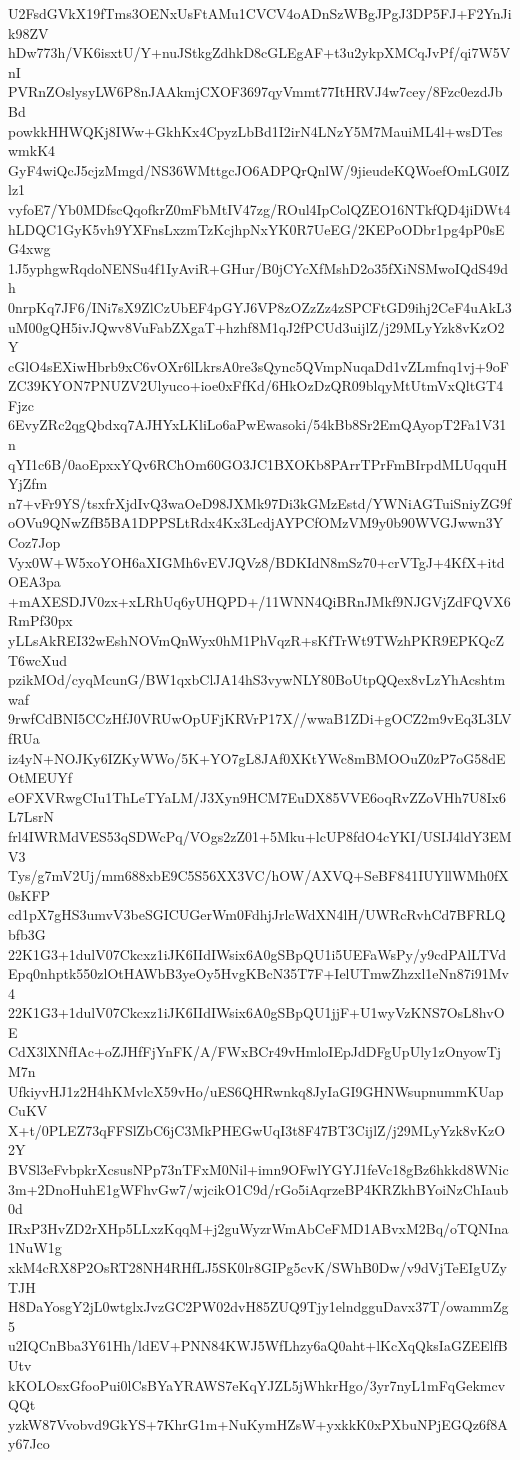 U2FsdGVkX19fTms3OENxUsFtAMu1CVCV4oADnSzWBgJPgJ3DP5FJ+F2YnJik98ZV
hDw773h/VK6isxtU/Y+nuJStkgZdhkD8cGLEgAF+t3u2ykpXMCqJvPf/qi7W5VnI
PVRnZOslysyLW6P8nJAAkmjCXOF3697qyVmmt77ItHRVJ4w7cey/8Fzc0ezdJbBd
powkkHHWQKj8IWw+GkhKx4CpyzLbBd1I2irN4LNzY5M7MauiML4l+wsDTeswmkK4
GyF4wiQcJ5cjzMmgd/NS36WMttgcJO6ADPQrQnlW/9jieudeKQWoefOmLG0IZlz1
vyfoE7/Yb0MDfscQqofkrZ0mFbMtIV47zg/ROul4IpColQZEO16NTkfQD4jiDWt4
hLDQC1GyK5vh9YXFnsLxzmTzKcjhpNxYK0R7UeEG/2KEPoODbr1pg4pP0sEG4xwg
1J5yphgwRqdoNENSu4f1IyAviR+GHur/B0jCYcXfMshD2o35fXiNSMwoIQdS49dh
0nrpKq7JF6/INi7sX9ZlCzUbEF4pGYJ6VP8zOZzZz4zSPCFtGD9ihj2CeF4uAkL3
uM00gQH5ivJQwv8VuFabZXgaT+hzhf8M1qJ2fPCUd3uijlZ/j29MLyYzk8vKzO2Y
cGlO4sEXiwHbrb9xC6vOXr6lLkrsA0re3sQync5QVmpNuqaDd1vZLmfnq1vj+9oF
ZC39KYON7PNUZV2Ulyuco+ioe0xFfKd/6HkOzDzQR09blqyMtUtmVxQltGT4Fjzc
6EvyZRc2qgQbdxq7AJHYxLKliLo6aPwEwasoki/54kBb8Sr2EmQAyopT2Fa1V31n
qYI1c6B/0aoEpxxYQv6RChOm60GO3JC1BXOKb8PArrTPrFmBIrpdMLUqquHYjZfm
n7+vFr9YS/tsxfrXjdIvQ3waOeD98JXMk97Di3kGMzEstd/YWNiAGTuiSniyZG9f
oOVu9QNwZfB5BA1DPPSLtRdx4Kx3LcdjAYPCfOMzVM9y0b90WVGJwwn3YCoz7Jop
Vyx0W+W5xoYOH6aXIGMh6vEVJQVz8/BDKIdN8mSz70+crVTgJ+4KfX+itdOEA3pa
+mAXESDJV0zx+xLRhUq6yUHQPD+/11WNN4QiBRnJMkf9NJGVjZdFQVX6RmPf30px
yLLsAkREI32wEshNOVmQnWyx0hM1PhVqzR+sKfTrWt9TWzhPKR9EPKQcZT6wcXud
pzikMOd/cyqMcunG/BW1qxbClJA14hS3vywNLY80BoUtpQQex8vLzYhAcshtmwaf
9rwfCdBNI5CCzHfJ0VRUwOpUFjKRVrP17X//wwaB1ZDi+gOCZ2m9vEq3L3LVfRUa
iz4yN+NOJKy6IZKyWWo/5K+YO7gL8JAf0XKtYWc8mBMOOuZ0zP7oG58dEOtMEUYf
eOFXVRwgCIu1ThLeTYaLM/J3Xyn9HCM7EuDX85VVE6oqRvZZoVHh7U8Ix6L7LsrN
frl4IWRMdVES53qSDWcPq/VOgs2zZ01+5Mku+lcUP8fdO4cYKI/USIJ4ldY3EMV3
Tys/g7mV2Uj/mm688xbE9C5S56XX3VC/hOW/AXVQ+SeBF841IUYllWMh0fX0sKFP
cd1pX7gHS3umvV3beSGICUGerWm0FdhjJrlcWdXN4lH/UWRcRvhCd7BFRLQbfb3G
22K1G3+1dulV07Ckcxz1iJK6IIdIWsix6A0gSBpQU1i5UEFaWsPy/y9cdPAlLTVd
Epq0nhptk550zlOtHAWbB3yeOy5HvgKBcN35T7F+IelUTmwZhzxl1eNn87i91Mv4
22K1G3+1dulV07Ckcxz1iJK6IIdIWsix6A0gSBpQU1jjF+U1wyVzKNS7OsL8hvOE
CdX3lXNfIAc+oZJHfFjYnFK/A/FWxBCr49vHmloIEpJdDFgUpUly1zOnyowTjM7n
UfkiyvHJ1z2H4hKMvlcX59vHo/uES6QHRwnkq8JyIaGI9GHNWsupnummKUapCuKV
X+t/0PLEZ73qFFSlZbC6jC3MkPHEGwUqI3t8F47BT3CijlZ/j29MLyYzk8vKzO2Y
BVSl3eFvbpkrXcsusNPp73nTFxM0Nil+imn9OFwlYGYJ1feVc18gBz6hkkd8WNic
3m+2DnoHuhE1gWFhvGw7/wjcikO1C9d/rGo5iAqrzeBP4KRZkhBYoiNzChIaub0d
IRxP3HvZD2rXHp5LLxzKqqM+j2guWyzrWmAbCeFMD1ABvxM2Bq/oTQNIna1NuW1g
xkM4cRX8P2OsRT28NH4RHfLJ5SK0lr8GIPg5cvK/SWhB0Dw/v9dVjTeEIgUZyTJH
H8DaYosgY2jL0wtglxJvzGC2PW02dvH85ZUQ9Tjy1elndgguDavx37T/owammZg5
u2IQCnBba3Y61Hh/ldEV+PNN84KWJ5WfLhzy6aQ0aht+lKcXqQksIaGZEElfBUtv
kKOLOsxGfooPui0lCsBYaYRAWS7eKqYJZL5jWhkrHgo/3yr7nyL1mFqGekmcvQQt
yzkW87Vvobvd9GkYS+7KhrG1m+NuKymHZsW+yxkkK0xPXbuNPjEGQz6f8Ay67Jco
